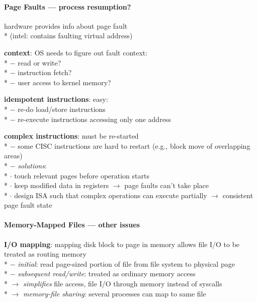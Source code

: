 \paragraph{Page Faults --- process resumption?}
\begin{items}
  \item hardware provides info about page fault \\*
    (intel:  contains faulting virtual address)
  \item \textbf{context}: OS needs to figure out fault context: \\*
    $ - $ read or write? \\*
    $ - $ instruction fetch? \\*
    $ - $ user access to kernel memory?
  \item \textbf{idempotent instructions}: easy: \\*
    $ - $ re-do load/store instructions \\*
    $ - $ re-execute instructions accessing only one address
  \item \textbf{complex instructions}: must be re-started \\*
    $ - $ some CISC instructions are hard to restart (e.g., block move of overlapping areas) \\*
    $ - $ \emph{solutions}: \\*
      \phantom{$ - $} $ \cdot $ touch relevant pages before operation starts \\*
      \phantom{$ - $} $ \cdot $ keep modified data in registers $ \to $ page faults can't take place \\*
      \phantom{$ - $} $ \cdot $ design ISA such that complex operations can execute partially $ \to $ consistent page fault state
\end{items}

\paragraph{Memory-Mapped Files --- other issues}
\begin{items}
  \item \textbf{I/O mapping}: mapping disk block to page in memory allows file I/O to be treated as routing memory  \\*
    $ - $ \emph{initial}: read page-sized portion of file from file system to physical page \\*
    $ - $ \emph{subsequent read/write}: treated as ordinary memory access \\*
    $ \to $ \emph{simplifies} file access, file I/O through memory instead of syscalls \\*
    $ \to $ \emph{memory-file sharing}: several processes can map to same file
\end{items}

